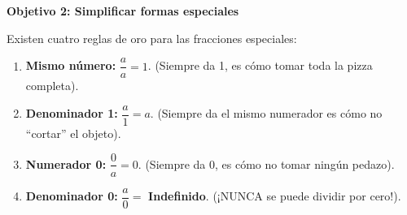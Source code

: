 \documentclass[12pt, letterpaper]{article}
\newenvironment{objetivo}[1]{%
    \begin{tcolorbox}[colback=valblue!10, colframe=valblue, arc=2mm, boxrule=1.5pt]
        {\large\bfseries \ding{118} #1}
    \end{tcolorbox}
}{}
\begin{document}
\begin{objetivo}{Objetivo 2: Simplificar formas especiales}
    \begin{concepto}
        Existen cuatro reglas de oro para las fracciones especiales:
        \begin{enumerate}
            \item \textbf{Mismo número:} {\large$\dfrac{a}{a} = 1$}. (Siempre da 1, es cómo tomar toda la pizza completa).\\
            \item \textbf{Denominador 1:} {\large$\dfrac{a}{1} = a$}. (Siempre da el mismo numerador es cómo no ``cortar'' el objeto).\\
            \item \textbf{Numerador 0:} {\large$\dfrac{0}{a} = 0$}. (Siempre da 0, es cómo no tomar ningún pedazo).\\
            \item \textbf{Denominador 0:} {\large$\dfrac{a}{0} = $} \textbf{Indefinido}. (¡NUNCA se puede dividir por cero!).\\
        \end{enumerate}
    \end{concepto}
    

\end{objetivo}
\end{document}
